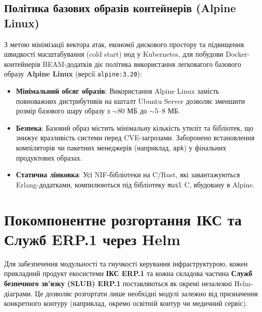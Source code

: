 \subsection{Політика базових образів контейнерів (Alpine Linux)}
 
З метою мінімізації вектора атак, економії дискового простору та підвищення швидкості масштабування (cold start) нод у Kubernetes, для побудови Docker-контейнерів BEAM-додатків діє політика використання легковагого базового образу \textbf{Alpine Linux} (версії \texttt{alpine:3.20}):
\begin{itemize}
    \item \textbf{Мінімальний обсяг образів}: Використання Alpine Linux замість повноважних дистрибутивів на кшталт Ubuntu Server дозволяє зменшити розмір базового шару образу з $\sim$80 МБ до $\sim$5--8 МБ.
    \item \textbf{Безпека}: Базовий образ містить мінімальну кількість утиліт та бібліотек, що знижує вразливість системи перед CVE-загрозами. Заборонено встановлення компіляторів чи пакетних менеджерів (наприклад, \texttt{apk}) у фінальних продуктових образах.
    \item \textbf{Статична лінковка}: Усі NIF-бібліотеки на C/Rust, які завантажуються Erlang-додатками, компилюються під бібліотеку \texttt{musl} C, вбудовану в Alpine.
\end{itemize}

\section{Покомпонентне розгортання ІКС та Служб ERP.1 через Helm}
  
Для забезпечення модульності та гнучкості керування інфраструктурою, кожен прикладний продукт екосистеми \textbf{ІКС ERP.1} та кожна складова частина \textbf{Служб безпечного зв'язку (SLUB) ERP.1} поставляються як окремі незалежні Helm-діаграми. Це дозволяє розгортати лише необхідні модулі залежно від призначення конкретного контуру (наприклад, окремо освітній контур чи медичний сервіс).

